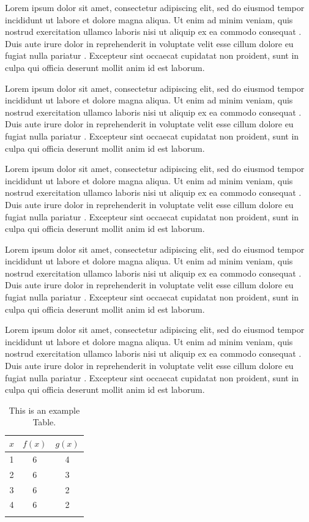 Lorem ipsum dolor sit amet, consectetur adipiscing elit, sed do eiusmod tempor incididunt ut labore et dolore magna aliqua. Ut enim ad minim veniam, quis nostrud exercitation ullamco laboris nisi ut aliquip ex ea commodo consequat \cite{ref1}. Duis aute irure dolor in reprehenderit in voluptate velit esse cillum dolore eu fugiat nulla pariatur \cite{ref2}. Excepteur sint occaecat cupidatat non proident, sunt in culpa qui officia deserunt mollit anim id est laborum.

Lorem ipsum dolor sit amet, consectetur adipiscing elit, sed do eiusmod tempor incididunt ut labore et dolore magna aliqua. Ut enim ad minim veniam, quis nostrud exercitation ullamco laboris nisi ut aliquip ex ea commodo consequat \cite{ref1}. Duis aute irure dolor in reprehenderit in voluptate velit esse cillum dolore eu fugiat nulla pariatur \cite{ref2}. Excepteur sint occaecat cupidatat non proident, sunt in culpa qui officia deserunt mollit anim id est laborum.

Lorem ipsum dolor sit amet, consectetur adipiscing elit, sed do eiusmod tempor incididunt ut labore et dolore magna aliqua. Ut enim ad minim veniam, quis nostrud exercitation ullamco laboris nisi ut aliquip ex ea commodo consequat \cite{ref1}. Duis aute irure dolor in reprehenderit in voluptate velit esse cillum dolore eu fugiat nulla pariatur \cite{ref2}. Excepteur sint occaecat cupidatat non proident, sunt in culpa qui officia deserunt mollit anim id est laborum.

Lorem ipsum dolor sit amet, consectetur adipiscing elit, sed do eiusmod tempor incididunt ut labore et dolore magna aliqua. Ut enim ad minim veniam, quis nostrud exercitation ullamco laboris nisi ut aliquip ex ea commodo consequat \cite{ref1}. Duis aute irure dolor in reprehenderit in voluptate velit esse cillum dolore eu fugiat nulla pariatur \cite{ref2}. Excepteur sint occaecat cupidatat non proident, sunt in culpa qui officia deserunt mollit anim id est laborum.

Lorem ipsum dolor sit amet, consectetur adipiscing elit, sed do eiusmod tempor incididunt ut labore et dolore magna aliqua. Ut enim ad minim veniam, quis nostrud exercitation ullamco laboris nisi ut aliquip ex ea commodo consequat \cite{ref1}. Duis aute irure dolor in reprehenderit in voluptate velit esse cillum dolore eu fugiat nulla pariatur \cite{ref2}. Excepteur sint occaecat cupidatat non proident, sunt in culpa qui officia deserunt mollit anim id est laborum.


\begin{table}
\caption{This is an example Table.}
\begin{center}
\begin{tabular}{ccc}
$x$ & $f(x)$ & $g(x)$ \\
\hline
1 & 6 & 4  \\
2 & 6 & 3  \\
3 & 6 & 2  \\
4 & 6 & 2  \\
\label{tab:ValuesOfFunctions}
\end{tabular}
\end{center}
\end{table}
